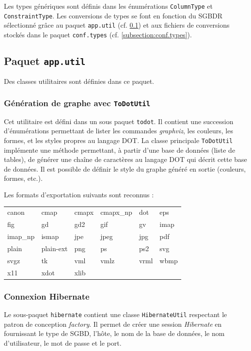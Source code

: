 Les types génériques sont définis dans les énumérations \texttt{ColumnType} et \texttt{ConstraintType}. Les conversions de types se font en fonction du SGBDR sélectionné grâce au paquet \texttt{app.util} (cf. \ref{subsection:app.util}) et aux fichiers de conversions stockés dans le paquet \texttt{conf.types} (cf. \ref{subsection:conf.types}).

\subsection{Paquet \texttt{app.util}}
\label{subsection:app.util}

Des classes utilitaires sont définies dans ce paquet.

\subsubsection{Génération de graphe avec \texttt{ToDotUtil}}
\label{section:ToDotUtil}
Cet utilitaire est défini dans un sous paquet \texttt{todot}. Il contient une succession d'énumérations permettant de lister les commandes \emph{graphviz}, les couleurs, les formes, et les styles propres au langage DOT.
La classe principale \texttt{ToDotUtil} implémente une méthode permettant, à partir d'une base de données (liste de tables), de générer une chaîne de caractères au langage DOT qui décrit cette base de données. Il est possible de définir le style du graphe généré en sortie (couleurs, formes, etc.).

Les formats d'exportation suivants sont reconnus : 

\begin{center}
\begin{tabular}{l l l l l l}
canon&cmap&cmapx&cmapx\_np&dot&eps \\
fig & gd & gd2 & gif & gv & imap \\
imap\_np & ismap & jpe & jpeg & jpg & pdf \\
plain & plain-ext & png & ps & ps2 & svg \\
svgz & tk & vml & vmlz & vrml & wbmp \\
x11 & xdot & xlib & & & \\
\end{tabular}
\end{center}

\subsubsection{Connexion Hibernate}
Le sous-paquet \texttt{hibernate} contient une classe \texttt{HibernateUtil} respectant le patron de conception \emph{factory}. Il permet de créer une session \emph{Hibernate} en fournissant le type de SGBD, l'hôte, le nom de la base de données, le nom d'utilisateur, le mot de passe et le port.

